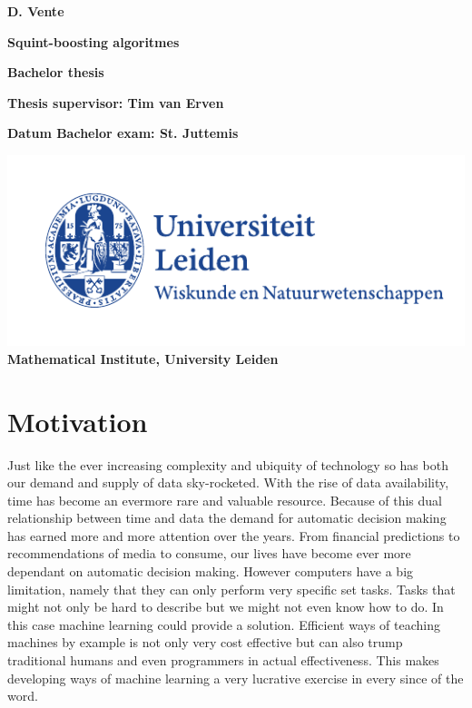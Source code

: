 \documentclass[a4paper,dutch,reqno]{article}
\theoremstyle{plain}
\theoremstyle{definition}
\begin{document}
\vspace*{7em}
\begin{center}
{\large\bf D. Vente\par} \vspace{3em} {\LARGE\bf Squint-boosting algoritmes\par} \vspace{3em} {\large\bf
Bachelor thesis\par} \vspace{1em} {\large\bf Thesis supervisor:
Tim van Erven\par} \vspace{3em} {\large\bf Datum
Bachelor exam: St. Juttemis\par}\vfill
\includegraphics{uniLogo}\\
\vspace{2em}
{\large\bf Mathematical Institute, University Leiden}
\end{center}

\thispagestyle{empty} 

\newpage
\tableofcontents
\newpage

\section{Motivation}
\label{motiv}
Just like the ever increasing complexity and ubiquity of technology so has both our demand and supply of data sky-rocketed. With the rise of data availability, time has become an evermore rare and valuable resource. Because of this dual relationship between time and data the demand for automatic decision making has earned more and more attention over the years. From financial predictions to recommendations of media to consume, our lives have become ever more dependant on automatic decision making. However computers have a big limitation, namely that they can only perform very specific set tasks. Tasks that might not only be hard to describe but we might not even know how to do. In this case machine learning could provide a solution. Efficient ways of teaching machines by example is not only very cost effective but can also trump traditional humans and even programmers in actual effectiveness. This makes developing ways of machine learning a very lucrative exercise in every since of the word. 




\end{document}
